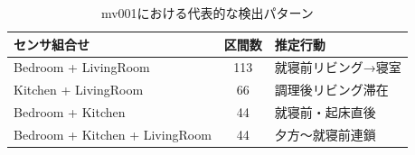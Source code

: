 \begin{table}[t]
\caption{mv001における代表的な検出パターン}
\label{tab:casas_mv001}
\begin{center}
\footnotesize
\begin{tabular}{p{3.5cm}cp{2.0cm}}
\hline
センサ組合せ & 区間数 & 推定行動 \\\hline
Bedroom + LivingRoom          & 113 & 就寝前リビング→寝室 \\
Kitchen + LivingRoom          &  66 & 調理後リビング滞在 \\
Bedroom + Kitchen             &  44 & 就寝前・起床直後 \\
Bedroom + Kitchen + LivingRoom &  44 & 夕方〜就寝前連鎖 \\\hline
\end{tabular}
\end{center}
\end{table}
